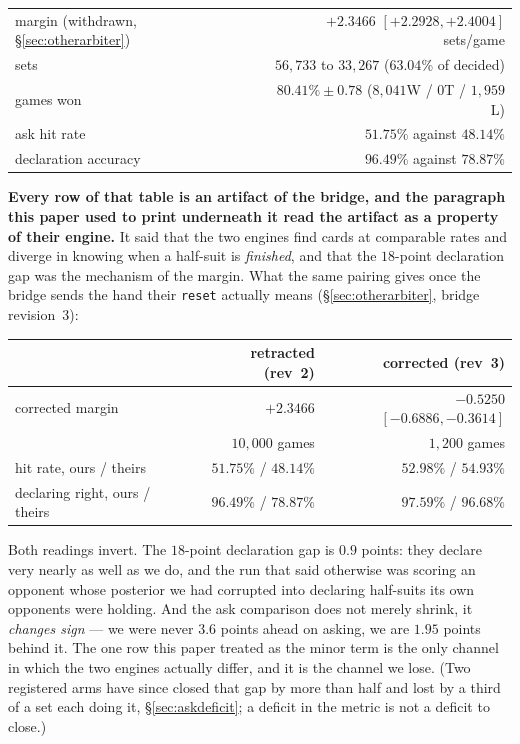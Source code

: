 \documentclass[11pt,letterpaper]{article}
\begin{document}
\begin{center}
\begin{tabular}{lr}
\toprule
margin (withdrawn, \S\ref{sec:otherarbiter}) & $+2.3466$ $[+2.2928, +2.4004]$ sets/game \\
sets & $56{,}733$ to $33{,}267$ ($63.04\%$ of decided) \\
games won & $80.41\% \pm 0.78$ ($8{,}041$W / $0$T / $1{,}959$L) \\
ask hit rate & $51.75\%$ against $48.14\%$ \\
declaration accuracy & $\mathbf{96.49\%}$ against $\mathbf{78.87\%}$ \\
\bottomrule
\end{tabular}
\end{center}

\noindent \textbf{Every row of that table is an artifact of the bridge, and
the paragraph this paper used to print underneath it read the artifact as a
property of their engine.} It said that the two engines find cards at
comparable rates and diverge in knowing when a half-suit is \emph{finished},
and that the $18$-point declaration gap was the mechanism of the margin. What
the same pairing gives once the bridge sends the hand their \texttt{reset}
actually means (\S\ref{sec:otherarbiter}, bridge revision~3):

\begin{center}
\begin{tabular}{lrr}
\toprule
 & retracted (rev~2) & \textbf{corrected (rev~3)} \\
\midrule
corrected margin & $+2.3466$ & $\mathbf{-0.5250}$ $[-0.6886, -0.3614]$ \\
 & $10{,}000$ games & $1{,}200$ games \\
hit rate, ours / theirs & $51.75\%$ / $48.14\%$ & $\mathbf{52.98\%}$ /
$\mathbf{54.93\%}$ \\
declaring right, ours / theirs & $96.49\%$ / $78.87\%$ &
$\mathbf{97.59\%}$ / $\mathbf{96.68\%}$ \\
\bottomrule
\end{tabular}
\end{center}

\noindent Both readings invert. The $18$-point declaration gap is $0.9$
points: they declare very nearly as well as we do, and the run that said
otherwise was scoring an opponent whose posterior we had corrupted into
declaring half-suits its own opponents were holding. And the ask comparison
does not merely shrink, it \emph{changes sign} --- we were never $3.6$ points
ahead on asking, we are $1.95$ points behind it. The one row this paper
treated as the minor term is the only channel in which the two engines
actually differ, and it is the channel we lose. (Two registered arms have
since closed that gap by more than half and lost by a third of a set each
doing it, \S\ref{sec:askdeficit}; a deficit in the metric is not a deficit to
close.)
\end{document}
